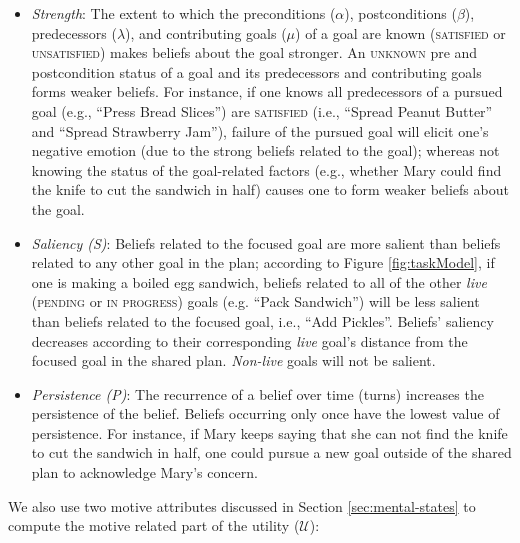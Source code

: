 \begin{itemize}[leftmargin=2pt]
  \setlength\itemsep{0.2mm}
  \item \textit{Strength}: The extent to which the preconditions ($\alpha$),
  postconditions ($\beta$), predecessors ($\lambda$), and contributing goals
  ($\mu$) of a goal are known (\textsc{satisfied} or \textsc{unsatisfied}) makes
  beliefs about the goal stronger. An \textsc{unknown} pre and postcondition
  status of a goal and its predecessors and contributing goals forms weaker
  beliefs. For instance, if one knows all predecessors of a pursued goal (e.g.,
  ``Press Bread Slices'') are \textsc{satisfied} (i.e., ``Spread Peanut Butter''
  and ``Spread Strawberry Jam''), failure of the pursued goal will elicit one's
  negative emotion (due to the strong beliefs related to the goal); whereas not
  knowing the status of the goal-related factors (e.g., whether Mary could find
  the knife to cut the sandwich in half) causes one to form weaker beliefs about
  the goal.
  \item \textit{Saliency (S)}: Beliefs related to the focused goal are more
  salient than beliefs related to any other goal in the plan; according to
  Figure \ref{fig:taskModel}, if one is making a boiled egg sandwich, beliefs
  related to all of the other \textit{live} (\textsc{pending} or \textsc{in
  progress}) goals (e.g. ``Pack Sandwich'') will be less salient than beliefs
  related to the focused goal, i.e., ``Add Pickles''. Beliefs' saliency
  decreases according to their corresponding \textit{live} goal's distance from
  the focused goal in the shared plan. \textit{Non-live} goals will not be
  salient.
  \item \textit{Persistence (P)}: The recurrence of a belief over time (turns)
  increases the persistence of the belief. Beliefs occurring only once have the
  lowest value of persistence. For instance, if Mary keeps saying that she can
  not find the knife to cut the sandwich in half, one could pursue a new goal
  outside of the shared plan to acknowledge Mary's concern.
\end{itemize}

\noindent We also use two motive attributes discussed in Section
\ref{sec:mental-states} to compute the motive related part of the utility
($\mathcal{U}$):

